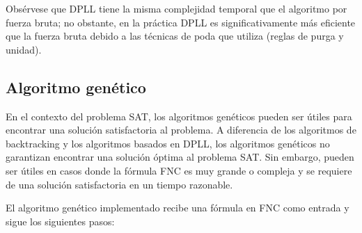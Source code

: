 \documentclass{article}
\begin{document}
                Obsérvese que DPLL tiene la misma complejidad temporal que el algoritmo por fuerza bruta; no obstante, en la práctica 
                DPLL es significativamente más eficiente que la fuerza bruta debido a las técnicas de poda que utiliza (reglas de purga y unidad).
    
    \subsection*{Algoritmo genético}
        
        En el contexto del problema SAT, los algoritmos genéticos pueden ser útiles para encontrar
        una solución satisfactoria al problema. A diferencia de los algoritmos de backtracking y los algoritmos
        basados en DPLL, los algoritmos genéticos no garantizan encontrar una solución óptima 
        al problema SAT. Sin embargo, pueden ser útiles en casos donde la fórmula FNC es muy grande o compleja
        y se requiere de una solución satisfactoria en un tiempo razonable.

        El algoritmo genético implementado recibe una fórmula en FNC como entrada y sigue los siguientes pasos:
\end{document}
